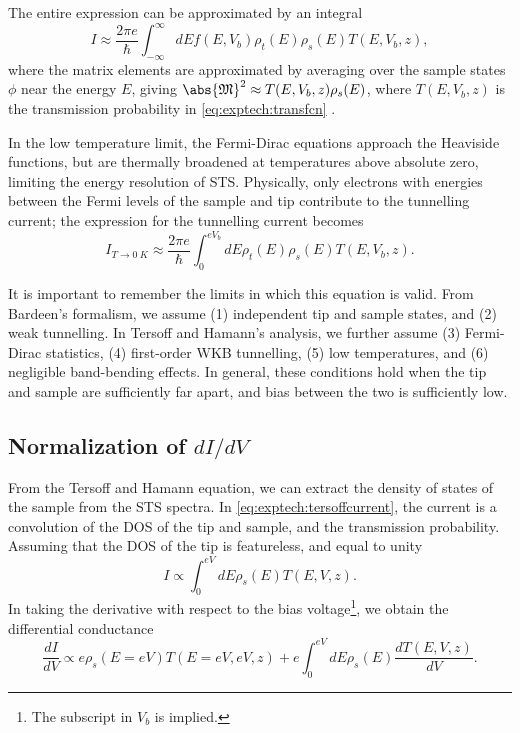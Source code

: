 The entire expression can be approximated by an integral
\begin{equation}
    I \approx \frac{2\pi e}{\hbar} \int_{-\infty}^\infty dE f(E,V_b) \rho_t(E)\rho_s(E) T(E,V_b,z),
\end{equation}
where the matrix elements are approximated by averaging over the sample states $\phi$ near the energy $E$, giving $\abs{\mathfrak{M}}^2 \approx T(E,V_b,z) \rho_s(E)$, where $T(E,V_b,z)$ is the transmission probability in \autoref{eq:exptech:transfcn} .

In the low temperature limit, the Fermi-Dirac equations approach the Heaviside functions, but are thermally broadened at temperatures above absolute zero, limiting the energy resolution of \ac{STS}. Physically, only electrons with energies between the Fermi levels of the sample and tip contribute to the tunnelling current; the expression for the tunnelling current becomes
\begin{equation} \label{eq:exptech:tersoffcurrent}
I_{T \rightarrow \SI{0}{K}} \approx \frac{2\pi e}{\hbar} \int_{0} ^{eV_b} dE \rho_{t}(E) \rho_{s}(E) T(E,V_b,z).
\end{equation}

It is important to remember the limits in which this equation is valid. From Bardeen's formalism, we assume (1) independent tip and sample states, and (2) weak tunnelling. In Tersoff and Hamann's analysis, we further assume (3) Fermi-Dirac statistics, (4) first-order \ac{WKB} tunnelling, (5) low temperatures, and (6) negligible band-bending effects. In general, these conditions hold when the tip and sample are sufficiently far apart, and bias between the two is sufficiently low.


\subsection{Normalization of $dI/dV$}

From the Tersoff and Hamann equation, we can extract the density of states of the sample from the \ac{STS} spectra. In \autoref{eq:exptech:tersoffcurrent}, the current is a convolution of the \ac{DOS} of the tip and sample, and the transmission probability. Assuming that the \ac{DOS} of the tip is featureless, and equal to unity
\begin{equation}
I \propto \int_0 ^{eV} dE \rho_s(E) T(E,V,z) .
\end{equation}
In taking the derivative with respect to the bias voltage\footnote{The subscript in $V_b$ is implied.}, we obtain the differential conductance
\begin{equation} \label{eq:exptech:didv}
\frac{dI}{dV} \propto e \rho_s(E=eV) T(E=eV,eV,z) + e \int_0^{eV} dE \rho_s(E) \frac{dT(E,V,z)}{dV}  .
\end{equation}

